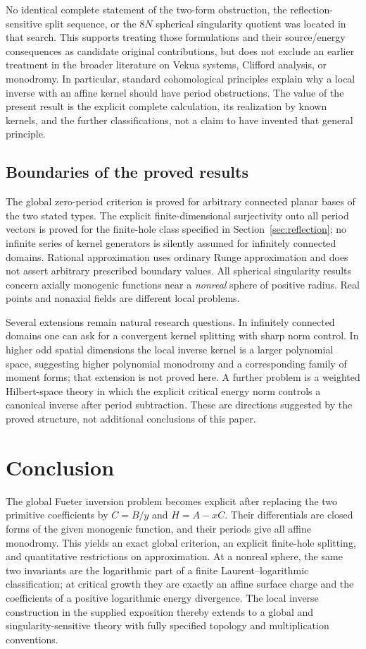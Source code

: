 \documentclass[11pt,a4paper]{article}
\numberwithin{equation}{section}
\theoremstyle{definition}
\theoremstyle{remark}
\begin{document}
No identical complete statement of the two-form obstruction, the
reflection-sensitive split sequence, or the $8N$ spherical singularity quotient
was located in that search. This supports treating those formulations and
their source/energy consequences as candidate original contributions, but does
not exclude an earlier treatment in the broader literature on Vekua systems,
Clifford analysis, or monodromy. In particular, standard cohomological
principles explain why a local inverse with an affine kernel should have
period obstructions. The value of the present result is the explicit complete
calculation, its realization by known kernels, and the further classifications,
not a claim to have invented that general principle.

\subsection{Boundaries of the proved results}
The global zero-period criterion is proved for arbitrary connected planar
bases of the two stated types. The explicit finite-dimensional surjectivity
onto all period vectors is proved for the finite-hole class specified in
Section~\ref{sec:reflection}; no infinite series of kernel generators is
silently assumed for infinitely connected domains. Rational approximation uses
ordinary Runge approximation and does not assert arbitrary prescribed boundary
values. All spherical singularity results concern axially monogenic functions
near a \emph{nonreal} sphere of positive radius. Real points and nonaxial fields
are different local problems.

Several extensions remain natural research questions. In infinitely connected
domains one can ask for a convergent kernel splitting with sharp norm control.
In higher odd spatial dimensions the local inverse kernel is a larger polynomial
space, suggesting higher polynomial monodromy and a corresponding family of
moment forms; that extension is not proved here. A further problem is a
weighted Hilbert-space theory in which the explicit critical energy norm
controls a canonical inverse after period subtraction. These are directions
suggested by the proved structure, not additional conclusions of this paper.

\section*{Conclusion}
The global Fueter inversion problem becomes explicit after replacing the two
primitive coefficients by $C=B/y$ and $H=A-xC$. Their differentials are closed
forms of the given monogenic function, and their periods give all affine
monodromy. This yields an exact global criterion, an explicit finite-hole
splitting, and quantitative restrictions on approximation. At a nonreal sphere,
the same two invariants are the logarithmic part of a finite Laurent--logarithmic
classification; at critical growth they are exactly an affine surface charge
and the coefficients of a positive logarithmic energy divergence. The local
inverse construction in the supplied exposition thereby extends to a global
and singularity-sensitive theory with fully specified topology and
multiplication conventions.
\end{document}
